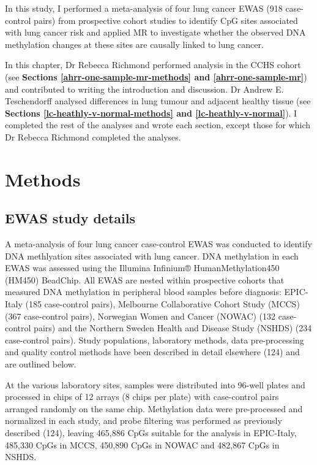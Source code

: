 \documentclass[11pt,oneside]{bristolthesis}
\begin{document}
In this study, I performed a meta-analysis of four lung cancer EWAS (918 case-control pairs) from prospective cohort studies to identify CpG sites associated with lung cancer risk and applied MR to investigate whether the observed DNA methylation changes at these sites are causally linked to lung cancer.

In this chapter, Dr Rebecca Richmond performed analysis in the CCHS cohort (see \textbf{Sections \ref{ahrr-one-sample-mr-methods} and \ref{ahrr-one-sample-mr}}) and contributed to writing the introduction and discussion. Dr Andrew E. Teschendorff analysed differences in lung tumour and adjacent healthy tissue (see \textbf{Sections \ref{lc-heathly-v-normal-methods} and \ref{lc-heathly-v-normal}}). I completed the rest of the analyses and wrote each section, except those for which Dr Rebecca Richmond completed the analyses.

\hypertarget{methods-07}{%
\section{Methods}\label{methods-07}}

\hypertarget{ewas-study-details}{%
\subsection{EWAS study details}\label{ewas-study-details}}

A meta-analysis of four lung cancer case-control EWAS was conducted to identify DNA methlyation sites associated with lung cancer. DNA methylation in each EWAS was assessed using the Illumina Infinium® HumanMethylation450 (HM450) BeadChip. All EWAS are nested within prospective cohorts that measured DNA methylation in peripheral blood samples before diagnosis: EPIC-Italy (185 case-control pairs), Melbourne Collaborative Cohort Study (MCCS) (367 case-control pairs), Norwegian Women and Cancer (NOWAC) (132 case-control pairs) and the Northern Sweden Health and Disease Study (NSHDS) (234 case-control pairs). Study populations, laboratory methods, data pre-processing and quality control methods have been described in detail elsewhere (124) and are outlined below.

At the various laboratory sites, samples were distributed into 96-well plates and processed in chips of 12 arrays (8 chips per plate) with case-control pairs arranged randomly on the same chip. Methylation data were pre-processed and normalized in each study, and probe filtering was performed as previously described (124), leaving 465,886 CpGs suitable for the analysis in EPIC-Italy, 485,330 CpGs in MCCS, 450,890 CpGs in NOWAC and 482,867 CpGs in NSHDS.
\end{document}
